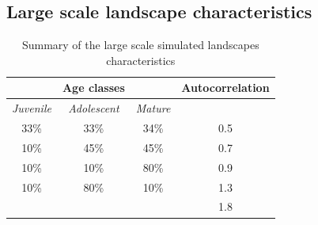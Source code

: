 \subsection{Large scale landscape characteristics}

\begin{table}[H]
\centering
\begin{tabular}{|ccc||c|}
\hline
 & Age classes &  & Autocorrelation \\
\hline
\textit{Juvenile}& \textit{Adolescent}& \textit{Mature}& \\
\hline
33\% & 33\% & 34\% & 0.5 \\
10\% & 45\% & 45\% & 0.7 \\
10\% & 10\% & 80\% & 0.9 \\
10\% & 80\% & 10\% & 1.3 \\
& & & 1.8\\
\hline
\end{tabular}
\caption{Summary of the large scale simulated landscapes characteristics}
\label{tab:composition_nlm}
\end{table}
\clearpage

